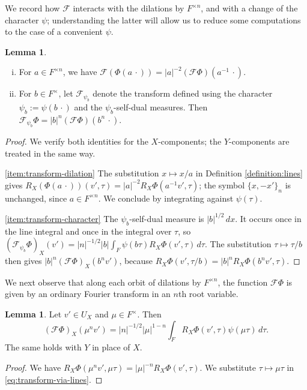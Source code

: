 \documentclass[reqno]{amsart}
\theoremstyle{plain}
\theoremstyle{definition}
\theoremstyle{itplain}
\newtheorem{lemma}[theorem]{Lemma}
\numberwithin{equation}{section}
\numberwithin{theorem}{section}
\begin{document}
We record how $\mathcal{F}$ interacts with the dilations by $F^{\times n}$, and with a change of the character $\psi$; understanding the latter will allow us to reduce some computations to the case of a convenient $\psi$.

\begin{lemma}\label{lemma:transform-dilation}
  \begin{enumerate}[(i)]
  \item\label{item:transform-dilation} For $a \in F^{\times n}$, we have $\mathcal{F}(\Phi(a \, \cdot)) = \lvert a \rvert^{-2} (\mathcal{F} \Phi)(a^{-1} \, \cdot)$.
  \item\label{item:transform-character} For $b \in F^\times$, let $\mathcal{F}_{\psi_b}$ denote the transform defined using the character $\psi_b := \psi(b \, \cdot)$ and the $\psi_b$-self-dual measures.  Then $\mathcal{F}_{\psi_b} \Phi = \lvert b \rvert^n (\mathcal{F} \Phi)(b^n \, \cdot)$.
  \end{enumerate}
\end{lemma}
\begin{proof}
  We verify both identities for the $X$-components; the $Y$-components are treated in the same way.

  \eqref{item:transform-dilation} The substitution $x \mapsto x / a$ in Definition \ref{definition:lines} gives $R_X (\Phi(a \, \cdot))(v', \tau) = \lvert a \rvert^{-2} R_X \Phi(a^{-1} v', \tau)$; the symbol $\{x, -x'\}_n$ is unchanged, since $a \in F^{\times n}$.  We conclude by integrating against $\psi(\tau)$.

  \eqref{item:transform-character} The $\psi_b$-self-dual measure is $\lvert b \rvert^{1/2} \, d x$.  It occurs once in the line integral and once in the integral over $\tau$, so $(\mathcal{F}_{\psi_b} \Phi)_X(v') = \lvert n \rvert^{-1/2} \lvert b \rvert \int_F \psi(b \tau) R_X \Phi(v', \tau) \, d \tau$.  The substitution $\tau \mapsto \tau / b$ then gives $\lvert b \rvert^n (\mathcal{F} \Phi)_X(b^n v')$, because $R_X \Phi(v', \tau / b) = \lvert b \rvert^n R_X \Phi(b^n v', \tau)$.
\end{proof}

We next observe that along each orbit of dilations by $F^{\times n}$, the function $\mathcal{F} \Phi$ is given by an ordinary Fourier transform in an $n$th root variable.
\begin{lemma}\label{lemma:transform-fourier}
  Let $v' \in U_X$ and $\mu \in F^\times$.  Then
  \begin{equation*}
    (\mathcal{F} \Phi)_X(\mu^n v') = \lvert n \rvert^{-1/2} \lvert \mu \rvert^{1 - n} \int_F R_X \Phi(v', \tau) \psi(\mu \tau) \, d \tau.
  \end{equation*}
  The same holds with $Y$ in place of $X$.
\end{lemma}
\begin{proof}
  We have $R_X \Phi(\mu^n v', \mu \tau) = \lvert \mu \rvert^{-n} R_X \Phi(v', \tau)$.  We substitute $\tau \mapsto \mu \tau$ in \eqref{eq:transform-via-lines}.
\end{proof}
\end{document}
